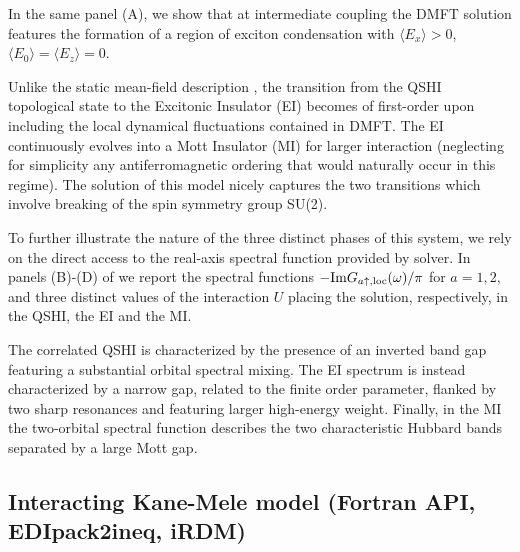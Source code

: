 \documentclass[edipack_sp.tex]{subfiles}
\begin{document}
In the same panel (A), we show that at intermediate coupling 
the DMFT solution features the formation of a
region of exciton condensation with $\langle E_x\rangle>0$, $\langle
E_0\rangle=\langle E_z\rangle=0$. 

Unlike the static mean-field description \cite{Blason2020PRB}, the
transition from the QSHI topological state to the Excitonic Insulator 
(EI) becomes of first-order upon including the local dynamical fluctuations \cite{Paoletti2024PRB,BellomiaKMH} contained in DMFT. 
The EI continuously evolves into a Mott Insulator (MI)
for larger interaction (neglecting for simplicity any 
antiferromagnetic ordering that would naturally occur in this
regime).
The \NAME solution of this model nicely captures the two transitions which involve breaking of the spin symmetry group SU(2). 



To further illustrate the nature of the three distinct phases of this
system, we rely on the direct access to the real-axis spectral
function provided by \NAME solver. In panels (B)-(D) of 
we report the spectral functions $-{\rm Im}{G}_{a\uparrow,\mathrm{loc}}(\omega)/\pi$ for
$a=1,2$, and three distinct values of the interaction
$U$ placing the solution, respectively, in the QSHI, the EI and the MI.

The correlated QSHI is characterized by the presence of an 
inverted band gap featuring a substantial orbital spectral mixing. The
EI spectrum is instead characterized by a narrow gap, related to the
finite order parameter, flanked by two sharp resonances and featuring
larger high-energy weight.
Finally, in the MI the two-orbital spectral function describes the two 
characteristic Hubbard bands separated by a large Mott gap.  








\subsection{Interacting Kane-Mele model (Fortran API, EDIpack2ineq, iRDM)}
\end{document}
